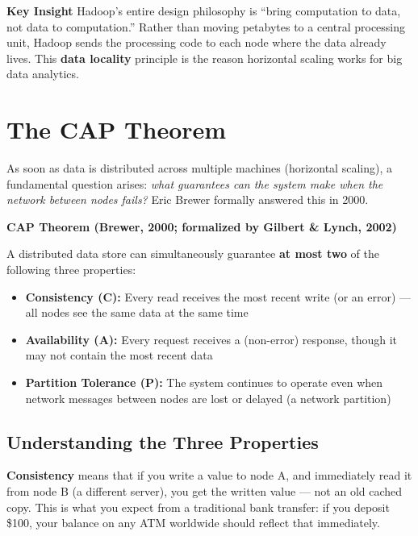 \documentclass[12pt,a4paper]{article}
\newcommand{\defbox}[2]{%
  \noindent
  \colorbox{PUNavy!12}{%
    \begin{minipage}{\dimexpr\linewidth-2\fboxsep}
      \vspace{4pt}
      \textbf{\textcolor{PUNavy}{#1}}\par\vspace{2pt}
      #2
      \vspace{4pt}
    \end{minipage}%
  }\par\vspace{6pt}%
}
\newcommand{\insightbox}[1]{%
  \noindent
  \colorbox{PUGold!18}{%
    \begin{minipage}{\dimexpr\linewidth-2\fboxsep}
      \vspace{4pt}
      \textcolor{PUGold!70!black}{\textbf{Key Insight}} \quad #1
      \vspace{4pt}
    \end{minipage}%
  }\par\vspace{6pt}%
}
\begin{document}
\insightbox{Hadoop's entire design philosophy is ``bring computation to data, not data to computation.'' Rather than moving petabytes to a central processing unit, Hadoop sends the processing code to each node where the data already lives. This \textbf{data locality} principle is the reason horizontal scaling works for big data analytics.}

\section{The CAP Theorem}

As soon as data is distributed across multiple machines (horizontal scaling), a fundamental question arises: \textit{what guarantees can the system make when the network between nodes fails?} Eric Brewer formally answered this in 2000.

\defbox{CAP Theorem (Brewer, 2000; formalized by Gilbert \& Lynch, 2002)}{A distributed data store can simultaneously guarantee \textbf{at most two} of the following three properties:\vspace{4pt}
\begin{itemize}[nosep, leftmargin=1.5em, after=\vspace{2pt}]
  \item \textbf{Consistency (C):} Every read receives the most recent write (or an error) — all nodes see the same data at the same time
  \item \textbf{Availability (A):} Every request receives a (non-error) response, though it may not contain the most recent data
  \item \textbf{Partition Tolerance (P):} The system continues to operate even when network messages between nodes are lost or delayed (a network partition)
\end{itemize}}

\subsection{Understanding the Three Properties}

\textbf{Consistency} means that if you write a value to node A, and immediately read it from node B (a different server), you get the written value — not an old cached copy. This is what you expect from a traditional bank transfer: if you deposit \$100, your balance on any ATM worldwide should reflect that immediately.
\end{document}
